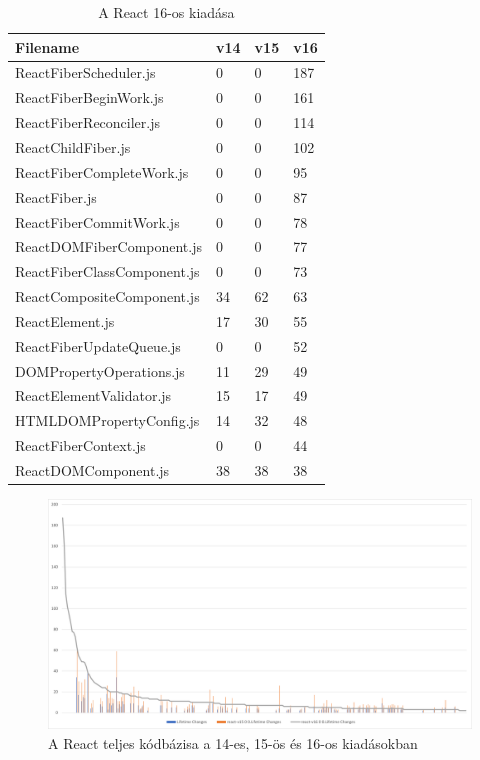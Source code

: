 \begin{table}[h]
    \centering
    \begin{tabular}{l|l|l|l}
        Filename                    & v14 & v15 & v16 \\ \hline
        ReactFiberScheduler.js      & 0   & 0   & 187 \\
        ReactFiberBeginWork.js      & 0   & 0   & 161 \\
        ReactFiberReconciler.js     & 0   & 0   & 114 \\
        ReactChildFiber.js          & 0   & 0   & 102 \\
        ReactFiberCompleteWork.js   & 0   & 0   & 95  \\
        ReactFiber.js               & 0   & 0   & 87  \\
        ReactFiberCommitWork.js     & 0   & 0   & 78  \\
        ReactDOMFiberComponent.js   & 0   & 0   & 77  \\
        ReactFiberClassComponent.js & 0   & 0   & 73  \\
        ReactCompositeComponent.js  & 34  & 62  & 63  \\
        ReactElement.js             & 17  & 30  & 55  \\
        ReactFiberUpdateQueue.js    & 0   & 0   & 52  \\
        DOMPropertyOperations.js    & 11  & 29  & 49  \\
        ReactElementValidator.js    & 15  & 17  & 49  \\
        HTMLDOMPropertyConfig.js    & 14  & 32  & 48  \\
        ReactFiberContext.js        & 0   & 0   & 44  \\
        ReactDOMComponent.js        & 38  & 38  & 38
    \end{tabular}
    \caption{A React 16-os kiadása}
    \label{tab:react-all-changes}
\end{table}

\begin{figure}[H]
    \centering
    \includegraphics[width=1\textwidth]{images/react/react-all-changes.png}
    \caption{A React teljes kódbázisa a 14-es, 15-ös és 16-os kiadásokban}
    \label{fig:react-all-changes}
\end{figure}